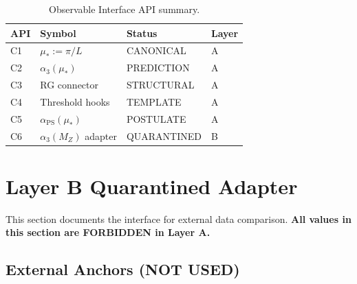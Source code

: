 \documentclass[11pt,a4paper]{article}
\theoremstyle{definition}
\begin{document}
\begin{table}[ht]
\centering
\caption{Observable Interface API summary.}
\label{tab:api-summary}
\begin{tabular}{llll}
\toprule
API & Symbol & Status & Layer \\
\midrule
C1 & $\mu_* := \pi/L$ & CANONICAL & A \\
C2 & $\alpha_3(\mu_*)$ & PREDICTION & A \\
C3 & RG connector & STRUCTURAL & A \\
C4 & Threshold hooks & TEMPLATE & A \\
C5 & $\alpha_{\text{PS}}(\mu_*)$ & POSTULATE & A \\
C6 & $\alpha_3(M_Z)$ adapter & QUARANTINED & B \\
\bottomrule
\end{tabular}
\end{table}

\section{Layer B Quarantined Adapter}
\label{sec:layer-b}

\begin{layerbbox}
This section documents the interface for external data comparison.
\textbf{All values in this section are FORBIDDEN in Layer A.}
\end{layerbbox}

\subsection{External Anchors (NOT USED)}
\label{subsec:external-anchors}
\end{document}

